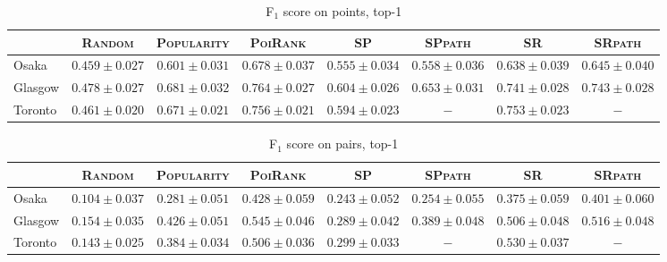 \begin{table*}[t]
\caption{F$_1$ score on points, top-1}
\centering
\small
\setlength{\tabcolsep}{4pt} %
\begin{tabular}{l|cc|cc|ccc} \hline
 & \textsc{Random} & \textsc{Popularity} & \textsc{PoiRank} & \textsc{SP} & \textsc{SPpath} & \textsc{SR} & \textsc{SRpath} \\ \hline
Osaka & $0.459\pm0.027$ & $0.601\pm0.031$ & $\mathbf{0.678\pm0.037}$ & $0.555\pm0.034$ & $0.558\pm0.036$ & $0.638\pm0.039$ & $\mathit{0.645\pm0.040}$ \\
Glasgow & $0.478\pm0.027$ & $0.681\pm0.032$ & $\mathbf{0.764\pm0.027}$ & $0.604\pm0.026$ & $0.653\pm0.031$ & $0.741\pm0.028$ & $\mathit{0.743\pm0.028}$ \\
Toronto & $0.461\pm0.020$ & $0.671\pm0.021$ & $\mathbf{0.756\pm0.021}$ & $0.594\pm0.023$ & $-$ & $\mathit{0.753\pm0.023}$ & $-$ \\
\hline
\end{tabular}
\end{table*}

\begin{table*}[t]
\caption{F$_1$ score on pairs, top-1}
\centering
\small
\setlength{\tabcolsep}{4pt} %
\begin{tabular}{l|cc|cc|ccc} \hline
 & \textsc{Random} & \textsc{Popularity} & \textsc{PoiRank} & \textsc{SP} & \textsc{SPpath} & \textsc{SR} & \textsc{SRpath} \\ \hline
Osaka & $0.104\pm0.037$ & $0.281\pm0.051$ & $\mathbf{0.428\pm0.059}$ & $0.243\pm0.052$ & $0.254\pm0.055$ & $0.375\pm0.059$ & $\mathit{0.401\pm0.060}$ \\
Glasgow & $0.154\pm0.035$ & $0.426\pm0.051$ & $\mathbf{0.545\pm0.046}$ & $0.289\pm0.042$ & $0.389\pm0.048$ & $0.506\pm0.048$ & $\mathit{0.516\pm0.048}$ \\
Toronto & $0.143\pm0.025$ & $0.384\pm0.034$ & $\mathit{0.506\pm0.036}$ & $0.299\pm0.033$ & $-$ & $\mathbf{0.530\pm0.037}$ & $-$ \\
\hline
\end{tabular}
\end{table*}

